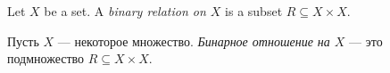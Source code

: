 \documentclass[../main/CT4S-EN-RU]{subfiles}
\begin{document}

\subsubsection{}

\begin{definitionENG}\label{def:binary relation}
Let $X$ be a set. A {\em binary relation on $X$} is a subset $R\subseteq X\times X.$ 
\end{definitionENG}

\begin{definitionRUS}\label{def:binary relation}
Пусть $X$ — некоторое множество. {\em Бинарное отношение на $X$} — это подмножество $R\subseteq X\times X.$ 
\end{definitionRUS}
\end{document}
